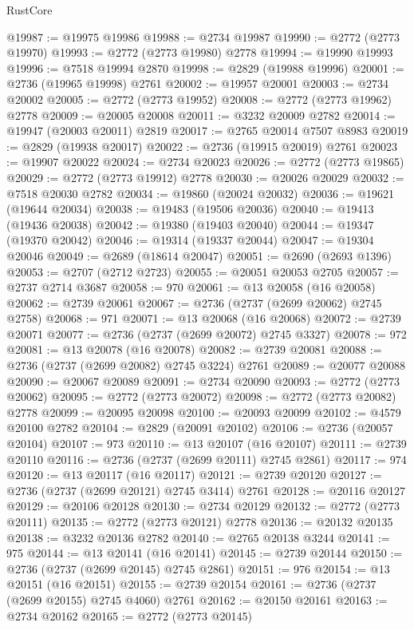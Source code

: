 \begin{lexlean}{RustCore}
\begin{coremodule}
@19987 := @19975 @19986
@19988 := @2734 @19987
@19990 := @2772 (@2773 @19970)
@19993 := @2772 (@2773 @19980) @2778
@19994 := @19990 @19993
@19996 := @7518 @19994 @2870
@19998 := @2829 (@19988 @19996)
@20001 := @2736 (@19965 @19998) @2761
@20002 := @19957 @20001
@20003 := @2734 @20002
@20005 := @2772 (@2773 @19952)
@20008 := @2772 (@2773 @19962) @2778
@20009 := @20005 @20008
@20011 := @3232 @20009 @2782
@20014 := @19947 (@20003 @20011) @2819
@20017 := @2765 @20014 @7507 @8983
@20019 := @2829 (@19938 @20017)
@20022 := @2736 (@19915 @20019) @2761
@20023 := @19907 @20022
@20024 := @2734 @20023
@20026 := @2772 (@2773 @19865)
@20029 := @2772 (@2773 @19912) @2778
@20030 := @20026 @20029
@20032 := @7518 @20030 @2782
@20034 := @19860 (@20024 @20032)
@20036 := @19621 (@19644 @20034)
@20038 := @19483 (@19506 @20036)
@20040 := @19413 (@19436 @20038)
@20042 := @19380 (@19403 @20040)
@20044 := @19347 (@19370 @20042)
@20046 := @19314 (@19337 @20044)
@20047 := @19304 @20046
@20049 := @2689 (@18614 @20047)
@20051 := @2690 (@2693 @1396)
@20053 := @2707 (@2712 @2723)
@20055 := @20051 @20053 @2705
@20057 := @2737 @2714 @3687
@20058 := 970
@20061 := @13 @20058 (@16 @20058)
@20062 := @2739 @20061
@20067 := @2736 (@2737 (@2699 @20062) @2745 @2758)
@20068 := 971
@20071 := @13 @20068 (@16 @20068)
@20072 := @2739 @20071
@20077 := @2736 (@2737 (@2699 @20072) @2745 @3327)
@20078 := 972
@20081 := @13 @20078 (@16 @20078)
@20082 := @2739 @20081
@20088 := @2736 (@2737 (@2699 @20082) @2745 @3224) @2761
@20089 := @20077 @20088
@20090 := @20067 @20089
@20091 := @2734 @20090
@20093 := @2772 (@2773 @20062)
@20095 := @2772 (@2773 @20072)
@20098 := @2772 (@2773 @20082) @2778
@20099 := @20095 @20098
@20100 := @20093 @20099
@20102 := @4579 @20100 @2782
@20104 := @2829 (@20091 @20102)
@20106 := @2736 (@20057 @20104)
@20107 := 973
@20110 := @13 @20107 (@16 @20107)
@20111 := @2739 @20110
@20116 := @2736 (@2737 (@2699 @20111) @2745 @2861)
@20117 := 974
@20120 := @13 @20117 (@16 @20117)
@20121 := @2739 @20120
@20127 := @2736 (@2737 (@2699 @20121) @2745 @3414) @2761
@20128 := @20116 @20127
@20129 := @20106 @20128
@20130 := @2734 @20129
@20132 := @2772 (@2773 @20111)
@20135 := @2772 (@2773 @20121) @2778
@20136 := @20132 @20135
@20138 := @3232 @20136 @2782
@20140 := @2765 @20138 @3244
@20141 := 975
@20144 := @13 @20141 (@16 @20141)
@20145 := @2739 @20144
@20150 := @2736 (@2737 (@2699 @20145) @2745 @2861)
@20151 := 976
@20154 := @13 @20151 (@16 @20151)
@20155 := @2739 @20154
@20161 := @2736 (@2737 (@2699 @20155) @2745 @4060) @2761
@20162 := @20150 @20161
@20163 := @2734 @20162
@20165 := @2772 (@2773 @20145)

\end{coremodule}
\end{lexlean}
